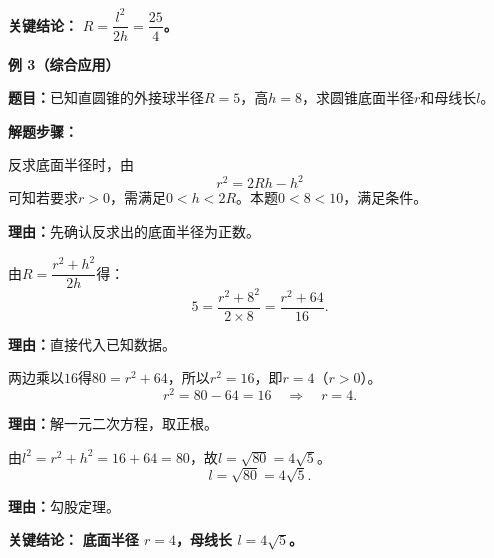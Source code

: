\begin{examplebox}
	\textbf{\textcolor{CExample}{关键结论：}} \textbf{$R = \dfrac{l^2}{2h} = \dfrac{25}{4}$。}

	\medskip
	\textbf{\textcolor{CExample}{例 3（综合应用）}}

	\textbf{\textcolor{CExample}{题目：}}已知直圆锥的外接球半径$R=5$，高$h=8$，求圆锥底面半径$r$和母线长$l$。

	\textbf{\textcolor{CExample}{解题步骤：}}
	\begin{description}[style=nextline, leftmargin=2.8em, labelsep=0.5em, itemsep=0.45em]
		\item[\textbf{第一步（检查存在性）：}] 反求底面半径时，由
		      \[
			      r^2=2Rh-h^2
		      \]
		      可知若要求$r>0$，需满足$0<h<2R$。本题$0<8<10$，满足条件。
		      \par\textbf{理由：}先确认反求出的底面半径为正数。

		\item[\textbf{第二步（代入公式）：}] 由$R = \dfrac{r^2+h^2}{2h}$得：
		      \[
			      5 = \frac{r^2+8^2}{2\times8} = \frac{r^2+64}{16}.
		      \]
		      \par\textbf{理由：}直接代入已知数据。
		\item[\textbf{第三步（解方程）：}] 两边乘以$16$得$80 = r^2+64$，所以$r^2=16$，即$r=4$（$r>0$）。
		      \[
			      r^2 = 80-64 = 16 \quad\Rightarrow\quad r=4.
		      \]
		      \par\textbf{理由：}解一元二次方程，取正根。
		\item[\textbf{第四步（求母线长）：}] 由$l^2 = r^2+h^2 = 16+64=80$，故$l = \sqrt{80} = 4\sqrt{5}$。
		      \[
			      l = \sqrt{80} = 4\sqrt{5}.
		      \]
		      \par\textbf{理由：}勾股定理。
	\end{description}

	\textbf{\textcolor{CExample}{关键结论：}} \textbf{底面半径 $r=4$，母线长 $l=4\sqrt{5}$。}

\end{examplebox}